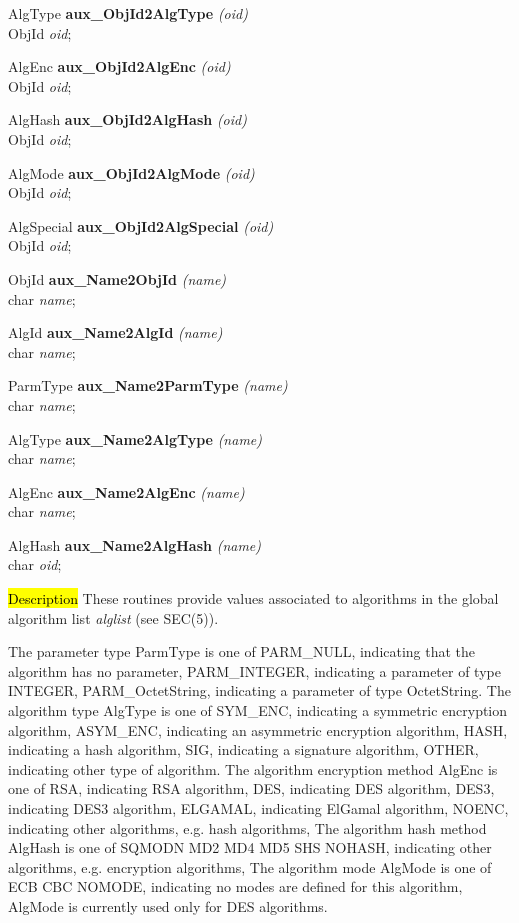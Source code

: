 AlgType {\bf aux\_ObjId2AlgType} {\em (oid)}  \\
ObjId {\em *oid};

AlgEnc {\bf aux\_ObjId2AlgEnc} {\em (oid)}  \\
ObjId {\em *oid};

AlgHash {\bf aux\_ObjId2AlgHash} {\em (oid)}  \\
ObjId {\em *oid};

AlgMode {\bf aux\_ObjId2AlgMode} {\em (oid)}  \\
ObjId {\em *oid};

AlgSpecial {\bf aux\_ObjId2AlgSpecial} {\em (oid)}  \\
ObjId {\em *oid};

ObjId {\bf *aux\_Name2ObjId} {\em (name)}  \\
char {\em *name};

AlgId {\bf *aux\_Name2AlgId} {\em (name)}  \\
char {\em *name};

ParmType {\bf aux\_Name2ParmType} {\em (name)} \\
char {\em *name};

AlgType {\bf aux\_Name2AlgType} {\em (name)}  \\
char {\em *name};

AlgEnc {\bf aux\_Name2AlgEnc} {\em (name)}  \\
char {\em *name};

AlgHash {\bf aux\_Name2AlgHash} {\em (name)}  \\
char {\em *oid};

\hl{Description}
These routines provide values associated to algorithms in the global
algorithm list {\em alglist} (see SEC(5)).

The parameter type ParmType is one of 
\bi
\m PARM\_NULL, indicating that the algorithm has no parameter,
\m PARM\_INTEGER, indicating a parameter of type INTEGER,
\m PARM\_OctetString, indicating a parameter of type OctetString.
\ei
The algorithm type AlgType is one of                                                   
\bi
\m SYM\_ENC, indicating a symmetric encryption algorithm,
\m ASYM\_ENC, indicating an asymmetric encryption algorithm,
\m HASH, indicating a hash algorithm,
\m SIG, indicating a signature algorithm,
\m OTHER, indicating other type of algorithm.
\ei
The algorithm encryption method AlgEnc is one of 
\bi
\m RSA, indicating RSA algorithm,
\m DES, indicating DES algorithm,
\m DES3, indicating DES3 algorithm,
\m ELGAMAL, indicating ElGamal algorithm,
\m NOENC, indicating other algorithms, e.g. hash algorithms,
\ei
The algorithm hash method AlgHash is one of 
\bi
\m SQMODN
\m MD2
\m MD4
\m MD5
\m SHS
\m NOHASH, indicating other algorithms, e.g. encryption algorithms,
\ei
The algorithm mode AlgMode is one of 
\bi
\m ECB
\m CBC
\m NOMODE, indicating no modes are defined for this algorithm,
\ei
AlgMode is currently used only for DES algorithms.

